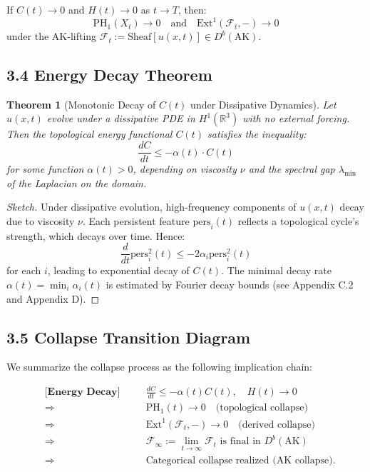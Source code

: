 \documentclass[11pt]{article}
\newtheorem{theorem}{Theorem}[section]
\begin{document}
\begin{proposition}
If $C(t) \to 0$ and $H(t) \to 0$ as $t \to T$, then:
\[
\mathrm{PH}_1(X_t) \to 0 \quad \text{and} \quad \mathrm{Ext}^1(\mathcal{F}_t, -) \to 0
\]
under the AK-lifting $\mathcal{F}_t := \mathrm{Sheaf}[u(x,t)] \in D^b(\mathrm{AK})$.
\end{proposition}

\subsection{3.4 Energy Decay Theorem}

\begin{theorem}[Monotonic Decay of $C(t)$ under Dissipative Dynamics]
Let $u(x,t)$ evolve under a dissipative PDE in $H^1(\mathbb{R}^3)$ with no external forcing.  
Then the topological energy functional $C(t)$ satisfies the inequality:
\[
\frac{dC}{dt} \leq -\alpha(t) \cdot C(t)
\]
for some function $\alpha(t) > 0$, depending on viscosity $\nu$ and the spectral gap $\lambda_{\min}$ of the Laplacian on the domain.
\end{theorem}

\begin{proof}[Sketch]
Under dissipative evolution, high-frequency components of $u(x,t)$ decay due to viscosity $\nu$.  
Each persistent feature $\text{pers}_i(t)$ reflects a topological cycle's strength, which decays over time. Hence:
\[
\frac{d}{dt} \mathrm{pers}_i^2(t) \leq -2\alpha_i \mathrm{pers}_i^2(t)
\]
for each $i$, leading to exponential decay of $C(t)$. The minimal decay rate $\alpha(t) = \min_i \alpha_i(t)$ is estimated by Fourier decay bounds (see Appendix C.2 and Appendix D).
\end{proof}

\subsection{3.5 Collapse Transition Diagram}

We summarize the collapse process as the following implication chain:

\begin{align*}
&\textbf{[Energy Decay]} \quad && \frac{dC}{dt} \leq -\alpha(t) C(t), \quad H(t) \to 0 \\
&\Longrightarrow \quad && \mathrm{PH}_1(t) \to 0 \quad \text{(topological collapse)} \\
&\Longrightarrow \quad && \mathrm{Ext}^1(\mathcal{F}_t, -) \to 0 \quad \text{(derived collapse)} \\
&\Longrightarrow \quad && \mathcal{F}_\infty := \lim_{t \to \infty} \mathcal{F}_t \text{ is final in } D^b(\mathrm{AK}) \\
&\Longrightarrow \quad && \text{Categorical collapse realized (AK collapse).}
\end{align*}
\end{document}
